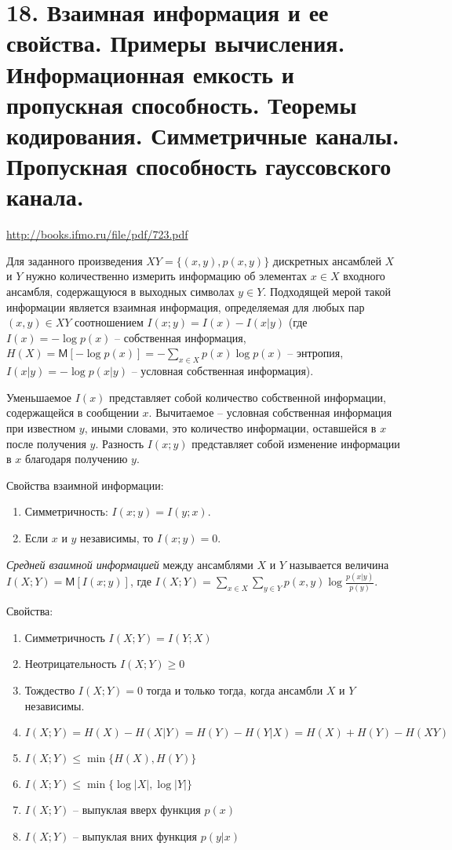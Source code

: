 \documentclass[a4paper,12pt]{article}
\newcommand{\MExpect}{\mathsf{M}}
\begin{document}
\section*{18. Взаимная информация и ее свойства. Примеры вычисления. Информационная емкость и пропускная способность. Теоремы кодирования. Симметричные каналы. Пропускная способность гауссовского канала.}
\url{http://books.ifmo.ru/file/pdf/723.pdf}

Для заданного произведения $XY=\{(x,y),p(x,y)\}$ дискретных ансамблей $X$ и $Y$ нужно количественно измерить информацию об элементах $x \in X$ входного ансамбля, содержащуюся в выходных символах $y \in Y$. Подходящей мерой такой информации является взаимная информация, определяемая для любых пар $(x,y) \in{XY}$ соотношением $I(x;y)=I(x)-I(x|y)$ (где $I(x)=-\log{p(x)}$ -- собственная информация, $H(X)=\MExpect[-\log p(x)]=-\sum_{x\in X}{p(x)\log p(x)}$ -- энтропия, $I(x|y)=-\log p(x|y)$ -- условная собственная информация).

Уменьшаемое $I(x)$ представляет собой количество собственной информации, содержащейся в сообщении $x$. Вычитаемое -- условная собственная информация при известном $y$, иными словами, это количество информации, оставшейся в $x$ после получения $y$. Разность $I(x;y)$ представляет собой изменение информации в $x$ благодаря получению $y$.

Свойства взаимной информации:
\begin{enumerate}
\item Симметричность: $I(x;y)=I(y;x)$.
\item Если $x$ и $y$ независимы, то $I(x;y)=0$.
\end{enumerate}

\textit{Средней взаимной информацией} между ансамблями $X$ и $Y$ называется величина $I(X;Y)=\MExpect [I(x;y)]$, где $I(X;Y)=\sum_{x\in X}\sum_{y\in Y}p(x,y)\log\frac{p(x|y)}{p(y)}$.

Свойства:
\begin{enumerate}
\item Симметричность $I(X;Y)=I(Y;X)$
\item Неотрицательность $I(X;Y) \ge 0$
\item Тождество $I(X;Y)=0$ тогда и только тогда, когда ансамбли $X$ и $Y$ независимы.
\item $I(X;Y)=H(X)-H(X|Y)=H(Y)-H(Y|X)=H(X)+H(Y)-H(XY)$
\item $I(X;Y)\le\min\{H(X),H(Y)\}$
\item $I(X;Y)\le\min\{\log|X|,\log|Y|\}$
\item $I(X;Y)$ -- выпуклая вверх функция $p(x)$
\item $I(X;Y)$ -- выпуклая вних функция $p(y|x)$
\end{enumerate}
\end{document}

